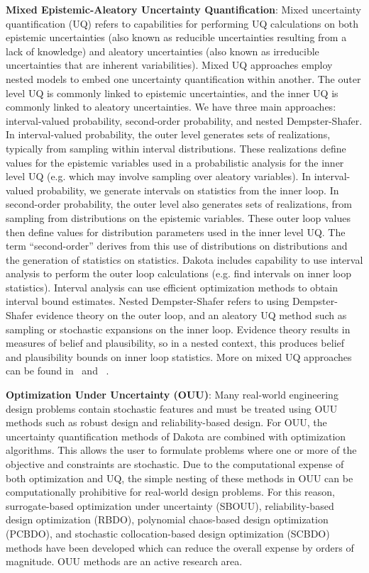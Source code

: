 \textbf{Mixed Epistemic-Aleatory Uncertainty Quantification}: Mixed
uncertainty quantification (UQ) refers to capabilities for performing
UQ calculations on both epistemic uncertainties (also known as
reducible uncertainties resulting from a lack of knowledge) and
aleatory uncertainties (also known as irreducible uncertainties that
are inherent variabilities).  Mixed UQ approaches employ nested models
to embed one uncertainty quantification within another.  The outer
level UQ is commonly linked to epistemic uncertainties, and the inner
UQ is commonly linked to aleatory uncertainties.  We have three main
approaches: interval-valued probability, second-order probability, and
nested Dempster-Shafer.  In interval-valued probability, the outer
level generates sets of realizations, typically from sampling within
interval distributions.  These realizations define values for the
epistemic variables used in a probabilistic analysis for the inner
level UQ (e.g. which may involve sampling over aleatory variables).
In interval-valued probability, we generate intervals on statistics
from the inner loop.  In second-order probability, the outer level
also generates sets of realizations, from sampling from distributions
on the epistemic variables.  These outer loop values then define
values for distribution parameters used in the inner level UQ.  The
term ``second-order'' derives from this use of distributions on
distributions and the generation of statistics on statistics.  Dakota
includes capability to use interval analysis to perform the outer loop
calculations (e.g. find intervals on inner loop statistics).  Interval
analysis can use efficient optimization methods to obtain interval
bound estimates.  Nested Dempster-Shafer refers to using
Dempster-Shafer evidence theory on the outer loop, and an aleatory UQ
method such as sampling or stochastic expansions on the inner loop.
Evidence theory results in measures of belief and plausibility, so in a
nested context, this produces belief and plausibility bounds on inner
loop statistics.  More on mixed UQ approaches can be found
in~\cite{Eld09b} and ~\cite{Eld11}.

\textbf{Optimization Under Uncertainty (OUU)}: Many real-world
engineering design problems contain stochastic features and must be
treated using OUU methods such as robust design and reliability-based
design. For OUU, the uncertainty quantification methods of Dakota are
combined with optimization algorithms. This allows the user to
formulate problems where one or more of the objective and constraints
are stochastic. Due to the computational expense of both optimization
and UQ, the simple nesting of these methods in OUU can be
computationally prohibitive for real-world design problems. For this
reason, surrogate-based optimization under uncertainty (SBOUU),
reliability-based design optimization (RBDO), polynomial chaos-based
design optimization (PCBDO), and stochastic collocation-based design
optimization (SCBDO) methods have been developed which can reduce the
overall expense by orders of magnitude. OUU methods are an active
research area.

